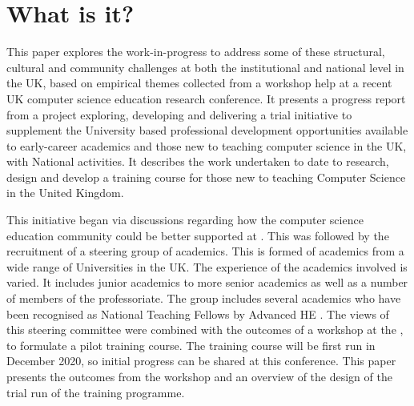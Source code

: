 \documentclass[sigconf]{acmart}
\begin{document}


\maketitle


\section{What is it?}	
This paper explores the work-in-progress to address some of these structural, cultural and community challenges at both the institutional and national level in the UK, based on empirical themes collected from a workshop help at a recent UK computer science education research conference. It presents a progress report from a project exploring, developing and delivering a trial initiative to supplement the University based professional development opportunities available to early-career academics and those new to teaching computer science in the UK, with National activities. It describes the work undertaken to date to research, design and develop a training course for those new to teaching Computer Science in the United Kingdom. 

This initiative began via discussions regarding how the computer science education community could be better supported at  . This was followed by the recruitment of a steering group of academics. This is formed of academics from a wide range of Universities in the UK. The experience of the academics involved is varied. It includes junior academics to more senior academics as well as a number of members of the professoriate. The group includes several academics who have been recognised as National Teaching Fellows by Advanced HE \cite{AdvancedHENTF}. The views of this steering committee were combined with the outcomes of a workshop at the  , to formulate a pilot training course. The training course will be first run in December 2020, so initial progress can be shared at this conference. This paper presents the outcomes from the workshop and an overview of the design of the trial run of the training programme.
\end{document}

